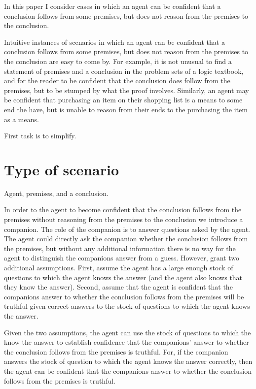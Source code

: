 \documentclass[10pt]{article}
\begin{document}
\newpage

In this paper I consider cases in which an agent can be confident that a conclusion follows from some premises, but does not reason from the premises to the conclusion.

Intuitive instances of scenarios in which an agent can be confident that a conclusion follows from some premises, but does not reason from the premises to the conclusion are easy to come by.
For example, it is not unusual to find a statement of premises and a conclusion in the problem sets of a logic textbook, and for the reader to be confident that the conclusion does follow from the premises, but to be stumped by what the proof involves.
Similarly, an agent may be confident that purchasing an item on their shopping list is a means to some end the have, but is unable to reason from their ends to the purchasing the item as a means.

First task is to simplify.

\section{Type of scenario}
\label{sec:type-scenario}

Agent, premises, and a conclusion.

In order to the agent to become confident that the conclusion follows from the premises without reasoning from the premises to the conclusion we introduce a companion.
The role of the companion is to answer questions asked by the agent.
The agent could directly ask the companion whether the conclusion follows from the premises, but without any additional information there is no way for the agent to distinguish the companions answer from a guess.
However, grant two additional assumptions.
First, assume the agent has a large enough stock of questions to which the agent knows the answer (and the agent also knows that they know the answer).
Second, assume that the agent is confident that the companions answer to whether the conclusion follows from the premises will be truthful given correct answers to the stock of questions to which the agent knows the answer.

Given the two assumptions, the agent can use the stock of questions to which the know the answer to establish confidence that the companions' answer to whether the conclusion follows from the premises is truthful.
For, if the companion answers the stock of question to which the agent knows the answer correctly, then the agent can be confident that the companions answer to whether the conclusion follows from the premises is truthful.
\end{document}
